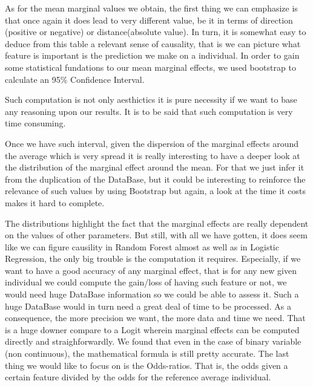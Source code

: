 As for the mean marginal values we obtain, the first thing we can emphasize is that once again it does lead to very different value, be it in terms of direction (positive or negative) or distance(absolute value). In turn, it is somewhat easy to deduce from this table a relevant sense of causality, that is we can picture what feature is important is the prediction we make on a individual.
In order to gain some statistical fundations to our mean marginal effects, we used bootstrap to calculate an 95\% Confidence Interval.


Such computation is not only aesthictics it is pure necessity if we want to base any reasoning upon our results. It is to be said that such computation is very time consuming.


Once we have such interval, given the dispersion of the marginal effects around the average which is very spread it is really interesting to have a deeper look at the distribution of the marginal effect around the mean. For that we just infer it from the duplication of the DataBase, but it could be interesting to  reinforce the relevance of such values by using Bootstrap but again, a look at the time it costs makes it hard to complete.



The distributions highlight the fact that the marginal effects are really dependent on the values of other parameters. But still, with all we have gotten, it does seem like we can figure causility in Random Forest almost as well as in Logistic Regression, the only big trouble is the computation it requires. Especially, if we want to have a good accuracy of any marginal effect, that is for any new given individual we could compute the gain/loss of having such feature or not, we would need huge DataBase information so we could be able to assess it. Such a huge DataBase would in turn need a great deal of time to be processed. As a consequence, the more precision we want, the more data and time we need. That is a huge downer compare to a Logit wherein marginal effects can be computed directly and straighforwardly. We found that even in the case of binary variable (non continuous), the mathematical formula is still pretty accurate.
The last thing we would like to focus on is the Odds-ratios. That is, the odds given a certain feature divided by the odds for the reference average individual.

